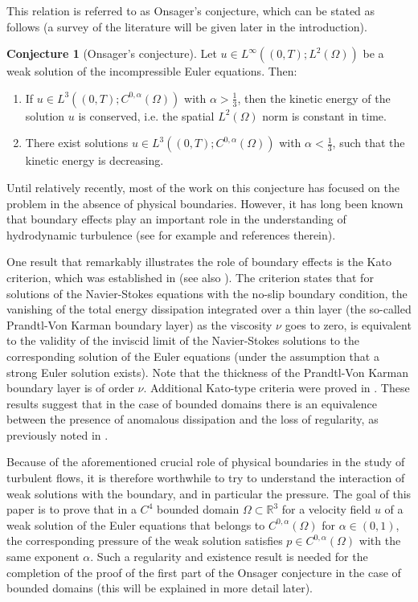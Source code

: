 \documentclass[12pt,a4paper]{article}
\theoremstyle{definition}
\newtheorem{conjecture}[theorem]{Conjecture}
\theoremstyle{remark}
\numberwithin{equation}{section}
\begin{document}
This relation is referred to as Onsager's conjecture, which can be stated as follows (a survey of the literature will be given later in the introduction).
\begin{conjecture}[Onsager's conjecture]
Let $u \in L^\infty ((0,T); L^2 (\Omega))$ be a weak solution of the incompressible Euler equations. Then:
\begin{enumerate}
    \item If $u \in L^3 ((0,T); C^{0,\alpha} (\Omega))$ with $\alpha > \frac{1}{3}$, then the kinetic energy of the solution $u$ is conserved, i.e. the spatial $L^2 (\Omega)$ norm is constant in time.
    \item There exist solutions $u \in L^3 ((0,T); C^{0,\alpha} (\Omega))$ with $\alpha < \frac{1}{3}$, such that the kinetic energy is decreasing.
\end{enumerate}
\end{conjecture}

Until relatively recently, most of the work on this conjecture has focused on the problem in the absence of physical boundaries. However, it has long been known that boundary effects play an important role in the understanding of hydrodynamic turbulence (see for example \cite{bardos2021,frisch} and references therein). 

One result that remarkably illustrates the role of boundary effects is the Kato criterion, which was established in \cite{kato} (see also \cite{bardoseuler,bardosturbulence}). The criterion states that for solutions of the Navier-Stokes equations with the no-slip boundary condition, the vanishing of the total energy dissipation integrated over a thin layer (the so-called Prandtl-Von Karman boundary layer) as the viscosity $\nu$ goes to zero, is equivalent to the validity of the inviscid limit of the Navier-Stokes solutions to the corresponding solution of the Euler equations (under the assumption that a strong Euler solution exists). Note that the thickness of the Prandtl-Von Karman boundary layer is of order $\nu$. Additional Kato-type criteria were proved in \cite{wang,constantinremarks,chenkato}. These results suggest that in the case of bounded domains there is an equivalence between the presence of anomalous dissipation and the loss of regularity, as previously noted in \cite{titi2019}. 

Because of the aforementioned crucial role of physical boundaries in the study of turbulent flows, it is therefore worthwhile to try to understand the interaction of weak solutions with the boundary, and in particular the pressure. The goal of this paper is to prove that in a $C^4$ bounded domain $\Omega \subset \mathbb{R}^3$ for a velocity field $u$ of a weak solution of the Euler equations that belongs to $C^{0,\alpha} (\Omega)$ for $\alpha \in (0,1)$, the corresponding pressure of the weak solution satisfies $p \in C^{0,\alpha} (\Omega)$ with the same exponent $\alpha$. Such a regularity and existence result is needed for the completion of the proof of the first part of the Onsager conjecture in the case of bounded domains \cite{titi2018} (this will be explained in more detail later).
\end{document}
